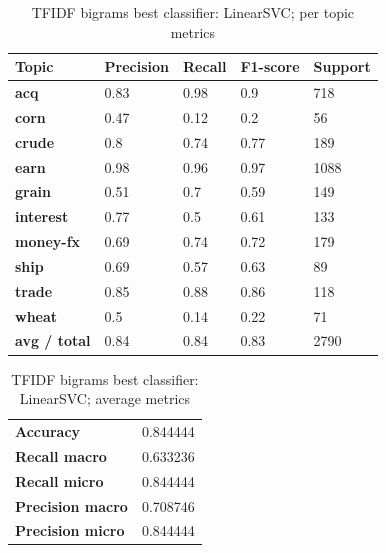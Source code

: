 \documentclass{article}
\begin{document}
\begin{table}[h]
\begin{tabular}{l|llll}
\textbf{Topic}       & \textbf{Precision} & \textbf{Recall} & \textbf{F1-score} & \textbf{Support} \\ \hline
\textbf{acq}         & 0.83               & 0.98            & 0.9               & 718              \\
\textbf{corn}        & 0.47               & 0.12            & 0.2               & 56               \\
\textbf{crude}       & 0.8                & 0.74            & 0.77              & 189              \\
\textbf{earn}        & 0.98               & 0.96            & 0.97              & 1088             \\
\textbf{grain}       & 0.51               & 0.7             & 0.59              & 149              \\
\textbf{interest}    & 0.77               & 0.5             & 0.61              & 133              \\
\textbf{money-fx}    & 0.69               & 0.74            & 0.72              & 179              \\
\textbf{ship}        & 0.69               & 0.57            & 0.63              & 89               \\
\textbf{trade}       & 0.85               & 0.88            & 0.86              & 118              \\
\textbf{wheat}       & 0.5                & 0.14            & 0.22              & 71               \\
\textbf{avg / total} & 0.84               & 0.84            & 0.83              & 2790            
\end{tabular}
\caption {TFIDF bigrams best classifier: LinearSVC; per topic metrics}
\end{table}

\begin{table}[h]
\begin{tabular}{l|l}
\textbf{Accuracy}        & 0.844444 \\
\textbf{Recall macro}    & 0.633236 \\
\textbf{Recall micro}    & 0.844444 \\
\textbf{Precision macro} & 0.708746 \\
\textbf{Precision micro} & 0.844444
\end{tabular}
\caption {TFIDF bigrams best classifier: LinearSVC; average metrics}
\end{table}
\end{document}
